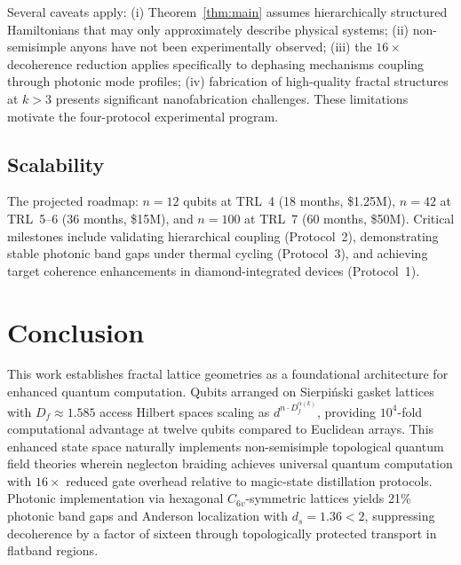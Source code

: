 \documentclass[aps,prx,twocolumn,groupedaddress,longbibliography]{revtex4-2}
\newcommand{\Df}{D_f}
\theoremstyle{plain}
\theoremstyle{definition}
\begin{document}
Several caveats apply: (i) Theorem~\ref{thm:main} assumes hierarchically structured Hamiltonians that may only approximately describe physical systems; (ii) non-semisimple anyons have not been experimentally observed; (iii) the $16\times$ decoherence reduction applies specifically to dephasing mechanisms coupling through photonic mode profiles; (iv) fabrication of high-quality fractal structures at $k > 3$ presents significant nanofabrication challenges. These limitations motivate the four-protocol experimental program.

\subsection{Scalability}

The projected roadmap: $n = 12$ qubits at TRL~4 (18 months, \$1.25M), $n = 42$ at TRL~5--6 (36 months, \$15M), and $n = 100$ at TRL~7 (60 months, \$50M). Critical milestones include validating hierarchical coupling (Protocol~2), demonstrating stable photonic band gaps under thermal cycling (Protocol~3), and achieving target coherence enhancements in diamond-integrated devices (Protocol~1).


\section{Conclusion}
\label{sec:conclusion}

This work establishes fractal lattice geometries as a foundational architecture for enhanced quantum computation. Qubits arranged on Sierpi\'{n}ski gasket lattices with $\Df \approx 1.585$ access Hilbert spaces scaling as $d^{n \cdot \Df^{\alpha(k)}}$, providing $10^4$-fold computational advantage at twelve qubits compared to Euclidean arrays. This enhanced state space naturally implements non-semisimple topological quantum field theories wherein neglecton braiding achieves universal quantum computation with $16\times$ reduced gate overhead relative to magic-state distillation protocols. Photonic implementation via hexagonal $C_{6v}$-symmetric lattices yields 21\% photonic band gaps and Anderson localization with $d_s = 1.36 < 2$, suppressing decoherence by a factor of sixteen through topologically protected transport in flatband regions.
\end{document}
